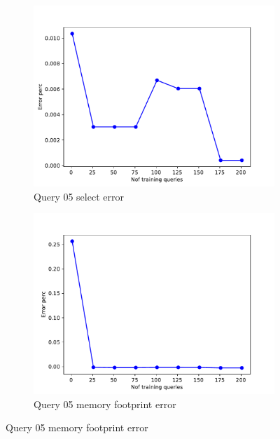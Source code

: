 \begin{figure}[!htb]

    \begin{subfigure}[t]{0.5\textwidth}
      \includegraphics[scale=0.4]{figs/tpch10/tpch10_sel05_error.pdf}
      \caption{Query 05 select error}
      \label{fig:tpch_sel05}
    \end{subfigure}
    \begin{subfigure}[t]{0.5\textwidth}
      \includegraphics[scale=0.4]{figs/tpch10/tpch10_q05_memerror.pdf}
      \caption{Query 05 memory footprint error}
      \label{fig:tpch_mem05}
    \end{subfigure}


\end{figure}
